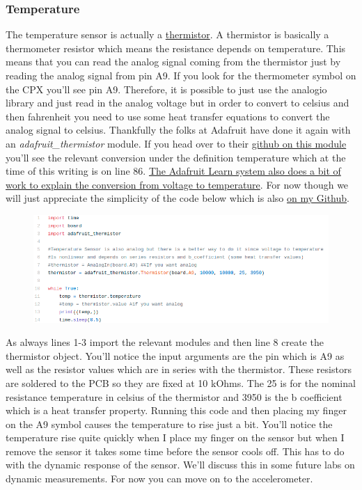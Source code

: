 {\subsubsection{Temperature}
The temperature sensor is actually a \href{https://en.wikipedia.org/wiki/Thermistor}{thermistor}. A thermistor is basically a thermometer resistor which means the resistance depends on temperature. This means that you can read the analog signal coming from the thermistor just by reading the analog signal from pin A9. If you look for the thermometer symbol on the CPX you’ll see pin A9. Therefore, it is possible to just use the analogio library and just read in the analog voltage but in order to convert to celsius and then fahrenheit you need to use some heat transfer equations to convert the analog signal to celsius. Thankfully the folks at Adafruit have done it again with an {\it adafruit\_thermistor} module. If you head over to their \href{https://github.com/adafruit/Adafruit_CircuitPython_Thermistor/blob/master/adafruit_thermistor.py}{github on this module} you’ll see the relevant conversion under the definition temperature which at the time of this writing is on line 86. \href{https://learn.adafruit.com/thermistor/circuitpython}{The Adafruit Learn system also does a bit of work to explain the conversion from voltage to temperature}. For now though we will just appreciate the simplicity of the code below which is also \href{https://github.com/cmontalvo251/Microcontrollers/blob/master/Circuit_Playground/CircuitPython/Temp/record_temperature_thermistor.py}{on my Github}.
\begin{figure}[H]
  \begin{center}
    \includegraphics[width=\textwidth]{Figures/thermistor_code.png}
  \end{center}
\end{figure}
As always lines 1-3 import the relevant modules and then line 8 create the thermistor object. You’ll notice the input arguments are the pin which is A9 as well as the resistor values which are in series with the thermistor. These resistors are soldered to the PCB so they are fixed at 10 kOhms. The 25 is for the nominal resistance temperature in celsius of the thermistor and 3950 is the b coefficient which is a heat transfer property. Running this code and then placing my finger on the A9 symbol causes the temperature to rise just a bit. You’ll notice the temperature rise quite quickly when I place my finger on the sensor but when I remove the sensor it takes some time before the sensor cools off. This has to do with the dynamic response of the sensor. We’ll discuss this in some future labs on dynamic measurements. For now you can move on to the accelerometer.
}
